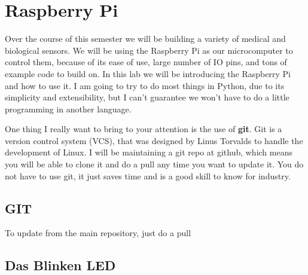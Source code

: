 \chapter{Raspberry Pi}

Over the course of this semester we will be building a variety of medical and biological sensors.  We will be using the Raspberry Pi as our microcomputer to control them, because of its ease of use, large number of IO pins, and tons of example code to build on.  In this lab we will be introducing the Raspberry Pi and how to use it.  I am going to try to do most things in Python, due to its simplicity and extensibility, but I can't guarantee we won't have to do a little programming in another language.

One thing I really want to bring to your attention is the use of \textbf{git}.  Git is a version control system (VCS), that was designed by Linus Torvalds to handle the development of Linux.  I will be maintaining a git repo at github, which means you will be able to clone it and do a pull any time you want to update it.  You do not have to use git, it just saves time and is a good skill to know for industry.

\section{GIT}







To update from the main repository, just do a pull



\section{Das Blinken LED}

